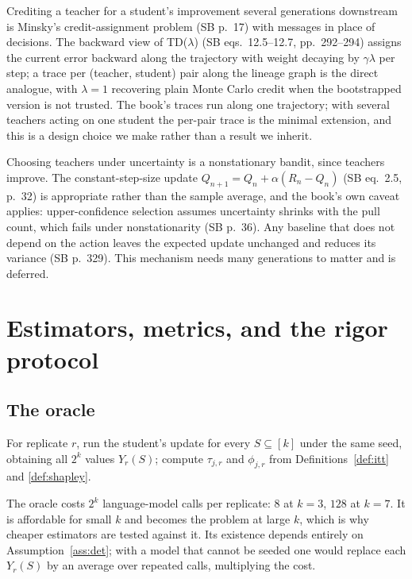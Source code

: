 \documentclass[11pt]{article}
\numberwithin{theorem}{section}
\theoremstyle{definition}
\theoremstyle{problemstyle}
\begin{document}
\begin{remark}
Crediting a teacher for a student's improvement several generations downstream is Minsky's credit-assignment problem
(SB p.~17) with messages in place of decisions. The backward view of TD($\lambda$) (SB eqs.~12.5--12.7, pp.~292--294)
assigns the current error backward along the trajectory with weight decaying by $\gamma\lambda$ per step; a trace per
(teacher, student) pair along the lineage graph is the direct analogue, with $\lambda=1$ recovering plain Monte Carlo
credit when the bootstrapped version is not trusted. The book's traces run along one trajectory; with several teachers
acting on one student the per-pair trace is the minimal extension, and this is a design choice we make rather than a
result we inherit.
\end{remark}

\begin{remark}
Choosing teachers under uncertainty is a nonstationary bandit, since teachers improve. The constant-step-size update
$Q_{n+1}=Q_n+\alpha(R_n-Q_n)$ (SB eq.~2.5, p.~32) is appropriate rather than the sample average, and the book's own
caveat applies: upper-confidence selection assumes uncertainty shrinks with the pull count, which fails under
nonstationarity (SB p.~36). Any baseline that does not depend on the action leaves the expected update unchanged and
reduces its variance (SB p.~329). This mechanism needs many generations to matter and is deferred.
\end{remark}

\section{Estimators, metrics, and the rigor protocol}\label{sec:est}

\subsection{The oracle}

\begin{definition}[Oracle]
For replicate $r$, run the student's update for every $S\subseteq[k]$ under the same seed, obtaining all $2^k$ values
$Y_r(S)$; compute $\tau_{j,r}$ and $\phi_{j,r}$ from Definitions~\ref{def:itt} and \ref{def:shapley}.
\end{definition}

\begin{remark}
The oracle costs $2^k$ language-model calls per replicate: $8$ at $k=3$, $128$ at $k=7$. It is affordable for small
$k$ and becomes the problem at large $k$, which is why cheaper estimators are tested against it. Its existence depends
entirely on Assumption~\ref{ass:det}; with a model that cannot be seeded one would replace each $Y_r(S)$ by an average
over repeated calls, multiplying the cost.
\end{remark}
\end{document}
